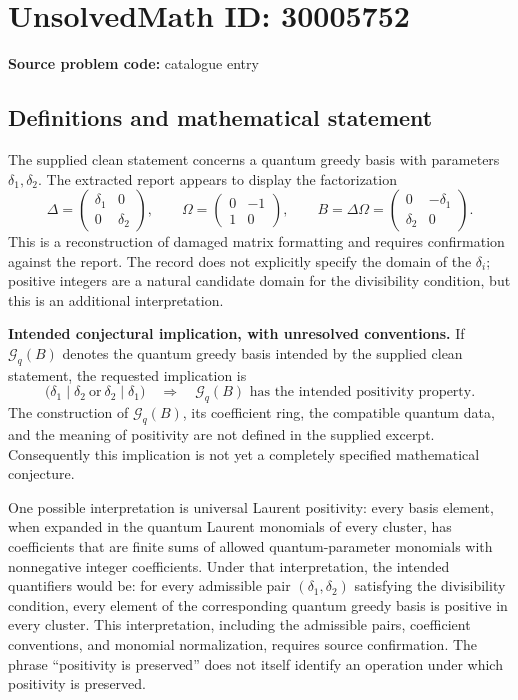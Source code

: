\documentclass[11pt]{article}
\begin{document}
\section*{UnsolvedMath ID: 30005752}
\textbf{Source problem code:} catalogue entry
\subsection{Definitions and mathematical statement}
The supplied clean statement concerns a quantum greedy basis with parameters \(\delta_1,\delta_2\). The extracted report appears to display the factorization
\[
\Delta=\begin{pmatrix}\delta_1&0\\0&\delta_2\end{pmatrix},\qquad
\Omega=\begin{pmatrix}0&-1\\1&0\end{pmatrix},\qquad
B=\Delta\Omega=\begin{pmatrix}0&-\delta_1\\\delta_2&0\end{pmatrix}.
\]
This is a reconstruction of damaged matrix formatting and requires confirmation against the report. The record does not explicitly specify the domain of the \(\delta_i\); positive integers are a natural candidate domain for the divisibility condition, but this is an additional interpretation.

\textbf{Intended conjectural implication, with unresolved conventions.} If \(\mathcal G_q(B)\) denotes the quantum greedy basis intended by the supplied clean statement, the requested implication is
\[
\bigl(\delta_1\mid\delta_2\ \text{or}\ \delta_2\mid\delta_1\bigr)
\quad\Longrightarrow\quad
\mathcal G_q(B)\text{ has the intended positivity property}.
\]
The construction of \(\mathcal G_q(B)\), its coefficient ring, the compatible quantum data, and the meaning of positivity are not defined in the supplied excerpt. Consequently this implication is not yet a completely specified mathematical conjecture.

One possible interpretation is universal Laurent positivity: every basis element, when expanded in the quantum Laurent monomials of every cluster, has coefficients that are finite sums of allowed quantum-parameter monomials with nonnegative integer coefficients. Under that interpretation, the intended quantifiers would be: for every admissible pair \((\delta_1,\delta_2)\) satisfying the divisibility condition, every element of the corresponding quantum greedy basis is positive in every cluster. This interpretation, including the admissible pairs, coefficient conventions, and monomial normalization, requires source confirmation. The phrase ``positivity is preserved'' does not itself identify an operation under which positivity is preserved.
\end{document}
